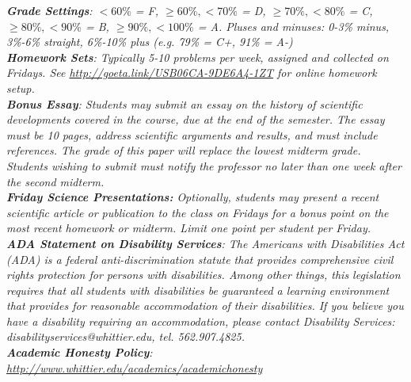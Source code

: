 \documentclass[10pt]{article}
\begin{document}
\textit{\textbf{Grade Settings}: $<60\%$ = F, $\geq 60\%, <70\%$ = D, $\geq 70\%, <80\%$ = C, $\geq 80\%, <90\%$ = B, $\geq 90\%, <100\%$ = A.  Pluses and minuses: 0-3\% minus, 3\%-6\% straight, 6\%-10\% plus (e.g. 79\% = C+, 91\% = A-)} \\
\textit{\textbf{Homework Sets}: Typically 5-10 problems per week, assigned and collected on Fridays.  See \url{http://goeta.link/USB06CA-9DE6A4-1ZT} for online homework setup.} \\
\textit{\textbf{Bonus Essay}: Students may submit an essay on the history of scientific developments covered in the course, due at
the end of the semester. The essay must be 10 pages, address scientific arguments and results, and must include
references. The grade of this paper will replace the lowest midterm grade.  Students wishing to submit must notify the professor no later than one week after the second midterm.} \\
\textit{\textbf{Friday Science Presentations:} Optionally, students may present a recent scientific article or publication to the class on Fridays for a bonus point on the most recent homework or midterm.  Limit one point per student per Friday.} \\
\textit{\textbf{ADA Statement on Disability Services}: The Americans with Disabilities Act (ADA) is a federal anti-discrimination statute that provides comprehensive civil rights protection for persons with disabilities. Among other things, this legislation requires that all students with disabilities be guaranteed a learning environment that provides for reasonable accommodation of their disabilities. If you believe you have a disability requiring an accommodation, please contact Disability Services: disabilityservices@whittier.edu, tel. 562.907.4825.} \\
\textit{\textbf{Academic Honesty Policy}: \url{http://www.whittier.edu/academics/academichonesty}} \\
\end{document}
